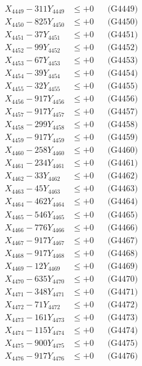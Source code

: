 \documentclass[a4paper,10pt]{article}
\begin{document}
{\begin{align}
X_{4449} - 311Y_{4449} &\leq +0 && \text{(G4449)} \\
X_{4450} - 825Y_{4450} &\leq +0 && \text{(G4450)} \\
\allowbreak
X_{4451} - 37Y_{4451} &\leq +0 && \text{(G4451)} \\
X_{4452} - 99Y_{4452} &\leq +0 && \text{(G4452)} \\
X_{4453} - 67Y_{4453} &\leq +0 && \text{(G4453)} \\
X_{4454} - 39Y_{4454} &\leq +0 && \text{(G4454)} \\
X_{4455} - 32Y_{4455} &\leq +0 && \text{(G4455)} \\
X_{4456} - 917Y_{4456} &\leq +0 && \text{(G4456)} \\
X_{4457} - 917Y_{4457} &\leq +0 && \text{(G4457)} \\
X_{4458} - 299Y_{4458} &\leq +0 && \text{(G4458)} \\
X_{4459} - 917Y_{4459} &\leq +0 && \text{(G4459)} \\
X_{4460} - 258Y_{4460} &\leq +0 && \text{(G4460)} \\
\allowbreak
X_{4461} - 234Y_{4461} &\leq +0 && \text{(G4461)} \\
X_{4462} - 33Y_{4462} &\leq +0 && \text{(G4462)} \\
X_{4463} - 45Y_{4463} &\leq +0 && \text{(G4463)} \\
X_{4464} - 462Y_{4464} &\leq +0 && \text{(G4464)} \\
X_{4465} - 546Y_{4465} &\leq +0 && \text{(G4465)} \\
X_{4466} - 776Y_{4466} &\leq +0 && \text{(G4466)} \\
X_{4467} - 917Y_{4467} &\leq +0 && \text{(G4467)} \\
X_{4468} - 917Y_{4468} &\leq +0 && \text{(G4468)} \\
X_{4469} - 12Y_{4469} &\leq +0 && \text{(G4469)} \\
X_{4470} - 635Y_{4470} &\leq +0 && \text{(G4470)} \\
\allowbreak
X_{4471} - 348Y_{4471} &\leq +0 && \text{(G4471)} \\
X_{4472} - 71Y_{4472} &\leq +0 && \text{(G4472)} \\
X_{4473} - 161Y_{4473} &\leq +0 && \text{(G4473)} \\
X_{4474} - 115Y_{4474} &\leq +0 && \text{(G4474)} \\
X_{4475} - 900Y_{4475} &\leq +0 && \text{(G4475)} \\
X_{4476} - 917Y_{4476} &\leq +0 && \text{(G4476)} \\

\end{align}}
\end{document}
